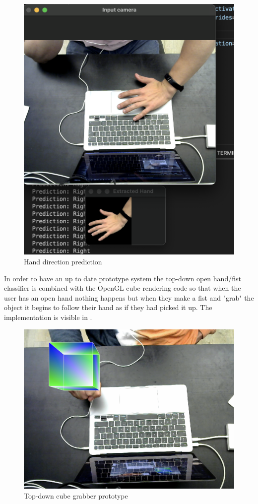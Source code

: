 \begin{figure}[h]
    \centering
    \includegraphics[width=0.7\linewidth]{figures/hand_direction_NN_first_attempt.png}
    \caption{Hand direction prediction}
    \label{fig:hand_direction_NN_first_attempt}
\end{figure}

In order to have an up to date prototype system the top-down open hand/fist classifier is combined with the OpenGL cube rendering code so that when the user has an open hand nothing happens but when they make a fist and "grab" the object it begins to follow their hand as if they had picked it up. The implementation is visible in .

\begin{figure}[h]
    \centering
    \includegraphics[width=0.7\linewidth]{figures/OpenGL_tensorflow_open_hand_fist_grabber.png}
    \caption{Top-down cube grabber prototype}
    \label{fig:OpenGL_tensorflow_open_hand_fist_grabber}
\end{figure}

